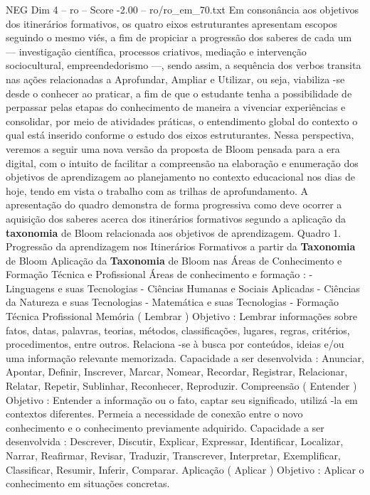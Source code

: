 \begin{textsample}{NEG Dim 4 – ro – Score -2.00 – ro/ro\_em\_70.txt}
Em consonância aos objetivos dos itinerários formativos, os quatro eixos estruturantes apresentam escopos seguindo o mesmo viés, a fim de propiciar a progressão dos saberes de cada um — investigação científica, processos criativos, mediação e intervenção sociocultural, empreendedorismo —, sendo assim, a sequência dos verbos transita nas ações relacionadas a Aprofundar, Ampliar e Utilizar, ou seja, viabiliza -se desde o conhecer ao praticar, a fim de que o estudante tenha a possibilidade de perpassar pelas etapas do conhecimento de maneira a vivenciar experiências e consolidar, por meio de atividades práticas, o entendimento global do contexto o qual está inserido conforme o estudo dos eixos estruturantes.
Nessa perspectiva, veremos a seguir uma nova versão da proposta de Bloom pensada para a era digital, com o intuito de facilitar a compreensão na elaboração e enumeração dos objetivos de aprendizagem ao planejamento no contexto educacional nos dias de hoje, tendo em vista o trabalho com as trilhas de aprofundamento.
A apresentação do quadro demonstra de forma progressiva como deve ocorrer a aquisição dos saberes acerca dos itinerários formativos segundo a aplicação da \textbf{taxonomia} de Bloom relacionada aos objetivos de aprendizagem.
Quadro 1.
Progressão da aprendizagem nos Itinerários Formativos a partir da \textbf{Taxonomia} de Bloom Aplicação da \textbf{Taxonomia} de Bloom nas Áreas de Conhecimento e Formação Técnica e Profissional Áreas de conhecimento e formação : - Linguagens e suas Tecnologias - Ciências Humanas e Sociais Aplicadas - Ciências da Natureza e suas Tecnologias - Matemática e suas Tecnologias - Formação Técnica Profissional Memória ( Lembrar ) Objetivo : Lembrar informações sobre fatos, datas, palavras, teorias, métodos, classificações, lugares, regras, critérios, procedimentos, entre outros.
Relaciona -se à busca por conteúdos, ideias e/ou uma informação relevante memorizada.
Capacidade a ser desenvolvida : Anunciar, Apontar, Definir, Inscrever, Marcar, Nomear, Recordar, Registrar, Relacionar, Relatar, Repetir, Sublinhar, Reconhecer, Reproduzir.
Compreensão ( Entender ) Objetivo : Entender a informação ou o fato, captar seu significado, utilizá -la em contextos diferentes.
Permeia a necessidade de conexão entre o novo conhecimento e o conhecimento previamente adquirido.
Capacidade a ser desenvolvida : Descrever, Discutir, Explicar, Expressar, Identificar, Localizar, Narrar, Reafirmar, Revisar, Traduzir, Transcrever, Interpretar, Exemplificar, Classificar, Resumir, Inferir, Comparar.
Aplicação ( Aplicar ) Objetivo : Aplicar o conhecimento em situações concretas.

\end{textsample}
